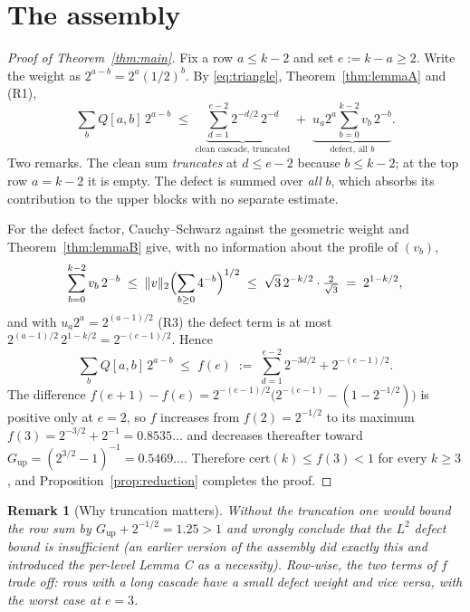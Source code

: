 \documentclass[12pt,a4paper]{article}
\newtheorem{remark}[theorem]{Remark}
\newcommand{\cert}{\mathrm{cert}}
\begin{document}
\section{The assembly}\label{sec:assembly}

\begin{proof}[Proof of Theorem~\ref{thm:main}]
Fix a row $a \le k-2$ and set $e := k - a \ge 2$. Write the weight as
$2^{a-b} = 2^a (1/2)^b$. By \eqref{eq:triangle}, Theorem~\ref{thm:lemmaA} and (R1),
\[
  \sum_b Q[a,b]\, 2^{a-b}
  \;\le\; \underbrace{\sum_{d=1}^{e-2} 2^{-d/2}\, 2^{-d}}_{\text{clean cascade, truncated}}
  \;+\; \underbrace{u_a 2^a \sum_{b=0}^{k-2} v_b\, 2^{-b}}_{\text{defect, all } b}.
\]
Two remarks. The clean sum \emph{truncates} at $d \le e-2$ because $b \le k-2$; at the top row
$a = k - 2$ it is empty. The defect is summed over \emph{all} $b$, which absorbs its
contribution to the upper blocks with no separate estimate.

For the defect factor, Cauchy--Schwarz against the geometric weight and Theorem~\ref{thm:lemmaB}
give, with no information about the profile of $(v_b)$,
\[
  \sum_{b=0}^{k-2} v_b\, 2^{-b}
  \;\le\; \|v\|_2 \Bigl( \sum_{b \ge 0} 4^{-b} \Bigr)^{1/2}
  \;\le\; \sqrt{3}\, 2^{-k/2} \cdot \tfrac{2}{\sqrt{3}} \;=\; 2^{1 - k/2},
\]
and with $u_a 2^a = 2^{(a-1)/2}$ (R3) the defect term is at most
$2^{(a-1)/2}\, 2^{1-k/2} = 2^{-(e-1)/2}$. Hence
\[
  \sum_b Q[a,b]\, 2^{a-b} \;\le\; f(e) \;:=\; \sum_{d=1}^{e-2} 2^{-3d/2} + 2^{-(e-1)/2}.
\]
The difference $f(e+1) - f(e) = 2^{-(e-1)/2}\bigl(2^{-(e-1)} - (1 - 2^{-1/2})\bigr)$ is positive
only at $e = 2$, so $f$ increases from $f(2) = 2^{-1/2}$ to its maximum
$f(3) = 2^{-3/2} + 2^{-1} = 0.8535\ldots$ and decreases thereafter toward
$G_{\mathrm{up}} = (2^{3/2} - 1)^{-1} = 0.5469\ldots$. Therefore
$\cert(k) \le f(3) < 1$ for every $k \ge 3$, and Proposition~\ref{prop:reduction} completes the
proof.
\end{proof}

\begin{remark}[Why truncation matters]\label{rem:truncation}
Without the truncation one would bound the row sum by
$G_{\mathrm{up}} + 2^{-1/2} = 1.25 > 1$ and wrongly conclude that the $L^2$ defect bound is
insufficient (an earlier version of the assembly did exactly this and introduced the per-level
Lemma C as a necessity). Row-wise, the two terms of $f$ trade off: rows with a long cascade have
a small defect weight and vice versa, with the worst case at $e = 3$.
\end{remark}
\end{document}
